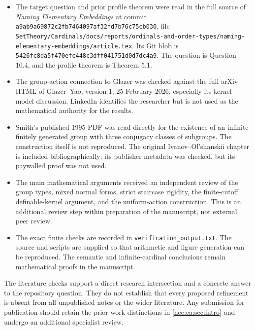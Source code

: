 \documentclass[11pt,letterpaper]{article}
\numberwithin{equation}{section}
\theoremstyle{plain}
\theoremstyle{definition}
\theoremstyle{remark}
\begin{document}
\begin{itemize}\raggedright
\item The target question and prior profile theorem were read in the full source of \emph{Naming Elementary Embeddings} at commit \nolinkurl{a9ab9a69872c2fb7464097af32fd7b76c75cb030}, file \nolinkurl{SetTheory/Cardinals/docs/reports/ordinals-and-order-types/naming-elementary-embeddings/article.tex}. Its Git blob is \nolinkurl{5426fc8da5f470efc448c3dff041751d0d7dc4a9}. The question is Question 10.4, and the profile theorem is Theorem 5.1.
\item The group-action connection to Glazer was checked against the full arXiv HTML of Glazer--Yao, version 1, 25 February 2026, especially its kernel-model discussion. LinkedIn identifies the researcher but is not used as the mathematical authority for the results.
\item Smith's published 1995 PDF was read directly for the existence of an infinite finitely generated group with three conjugacy classes of subgroups. The construction itself is not reproduced. The original Ivanov--Ol'shanskii chapter is included bibliographically; its publisher metadata was checked, but its paywalled proof was not used.
\item The main mathematical arguments received an independent review of the group types, mixed normal forms, strict staircase rigidity, the finite-cutoff definable-kernel argument, and the uniform-action construction. This is an additional review step within preparation of the manuscript, not external peer review.
\item The exact finite checks are recorded in \texttt{verification\_output.txt}. The source and scripts are supplied so that arithmetic and figure generation can be reproduced. The semantic and infinite-cardinal conclusions remain mathematical proofs in the manuscript.
\end{itemize}

The literature checks support a direct research intersection and a concrete answer to the repository question. They do not establish that every proposed refinement is absent from all unpublished notes or the wider literature. Any submission for publication should retain the prior-work distinctions in \cref{nee:ca:sec:intro} and undergo an additional specialist review.

\clearpage
{}
\end{document}
